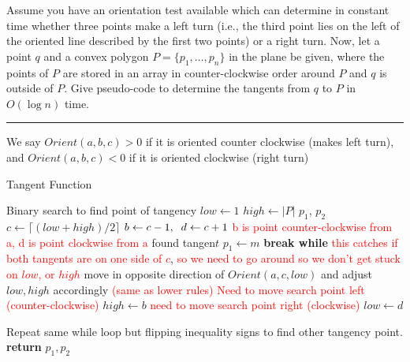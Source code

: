\documentclass[11pt]{article}
\begin{document}

Assume you have an orientation test available which can determine in constant
time whether three points make a left turn (i.e., the third point lies on the
left of the oriented line described by the first two points) or a right turn.
Now, let a point $q$ and a convex polygon $P = \{ p_1, \ldots , p_n \}$ in the
plane be given, where the points of $P$ are stored in an array in
counter-clockwise order around $P$ and $q$ is outside of $P$. Give pseudo-code
to determine the tangents from $q$ to $P$ in $O(\log n)$ time.

\hrule

We say $Orient(a,b,c) > 0$ if it is oriented counter clockwise (makes left turn), and $Orient(a,b,c) < 0$ if it is oriented clockwise (right turn)

\begin{algorithm}
    \caption{Tangent Function}\label{guests}
    \label{alg:prob1}
    \begin{algorithmic}[1]
        \State Binary search to find point of tangency
        \State $low \gets 1$
        \State $high \gets |P|$
        \State $p_1$, $p_2$
            \State $c \gets \lceil (low + high)/2 \rceil$
            \State $b \gets c-1, \sp d \gets c + 1$ \quad \textcolor{red}{b is point counter-clockwise from a, d is point clockwise from a}
                \State found tangen$t$
                \State $p_1 \gets m$
                \State \textbf{break while}
                \State \textcolor{red}{this catches if both tangents are on one side of $c$}, 
                \State \textcolor{red}{so we need to go around so we don't get stuck on $low$, or $high$}
                \State move in opposite direction of $Orient(a, c, low)$ and adjust $low, high$ accordingly 
                \State \textcolor{red}{(same as lower rules)}
                \State \textcolor{red}{Need to move search point left (counter-clockwise)}
                \State $high \gets b$
                \State \textcolor{red}{need to move search point right (clockwise)}
                \State $low \gets d$
            \EndIf
        \EndWhile

        \State Repeat same while loop but flipping inequality signs to find other tangency point.
        \State \textbf{return} $p_1, p_2$
    \EndFunction
    \end{algorithmic}
\end{algorithm}
\end{document}
